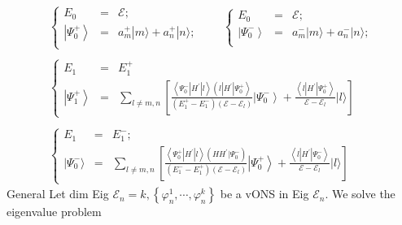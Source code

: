 \begin{equation}
\begin{array}{l}
{\left\{\begin{array} {ccl}
    E_{0} &=&\mathcal{E} ; \\
    \left|\Psi_{0}^{+}\right\rangle &=& a_{m}^{+}|m\rangle+ a_{n}^{+}|n\rangle ; \\
    \end{array}\right.}\qquad
    {\left\{\begin{array} {ccl}
        E_{0} &=&\mathcal{E} ; \\
        \left|\Psi_{0}^{-}\right\rangle &=& a_{m}^{-}|m\rangle+ a_{n}^{-}|n\rangle ; \\
        \end{array}\right.}\\\\    
{\left\{\begin{array}{ccl}
    E_{1} &=& E_{1}^{+} \\
    \left|\Psi_{1}^{+}\right\rangle &=&\sum_{l \neq m, n}\left[\frac{\left\langle\Psi_{0}^{-}\left|H^{\prime}\right| l\right\rangle\left(l\left|H^{\prime}\right| \Psi_{0}^{+}\right\rangle}{\left(E_{1}^{+}-E_{1}^{-}\right)\left(\mathcal{E}-\mathcal{E}_{l}\right)}\left|\Psi_{0}^{-}\right\rangle+\frac{\left\langle l\left|H^{\prime}\right| \Psi_{0}^{+}\right\rangle}{\mathcal{E}-\mathcal{E}_{l}}|l\rangle\right]
\end{array}\right.}\\\\
{\left\{\begin{array}{ccl}
    E_1 &=& E_1^-;\\
    |\Psi_{0}^{-}\rangle&=&\sum_{l \neq m, n}\left[\frac{\left\langle\Psi_{0}^{+}\left|H^{\prime}\right| l\right\rangle\left(H H^{\prime} | \Psi_{0}^{-}\right)}{\left(E_{1}^{-}-E_{1}^{+}\right)\left(\mathcal{E}-\mathcal{E}_{l}\right)}\left|\Psi_{0}^{+}\right\rangle+\frac{\left\langle l\left|H^{\prime}\right| \Psi_{0}^{-}\right\rangle}{\mathcal{E}-\mathcal{E}_{l}}|l\rangle\right] 
\end{array}\right.}
\end{array}
\end{equation}
General Let dim Eig $\mathcal{E}_{n}=k,\left\{\varphi_{n}^{1}, \cdots, \varphi_{n}^{k}\right\}$ be a vONS in Eig $\mathcal{E}_n$. We solve the eigenvalue problem
